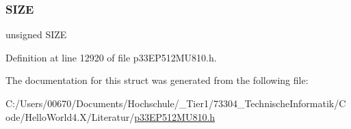 \subsubsection{\texorpdfstring{S\+I\+ZE}{SIZE}}
{\footnotesize\ttfamily unsigned S\+I\+ZE}



Definition at line 12920 of file p33\+E\+P512\+M\+U810.\+h.



The documentation for this struct was generated from the following file\+:\begin{DoxyCompactItemize}
\item 
C\+:/\+Users/00670/\+Documents/\+Hochschule/\+\_\+\+Tier1/73304\+\_\+\+Technische\+Informatik/\+Code/\+Hello\+World4.\+X/\+Literatur/\hyperlink{p33_e_p512_m_u810_8h}{p33\+E\+P512\+M\+U810.\+h}\end{DoxyCompactItemize}
